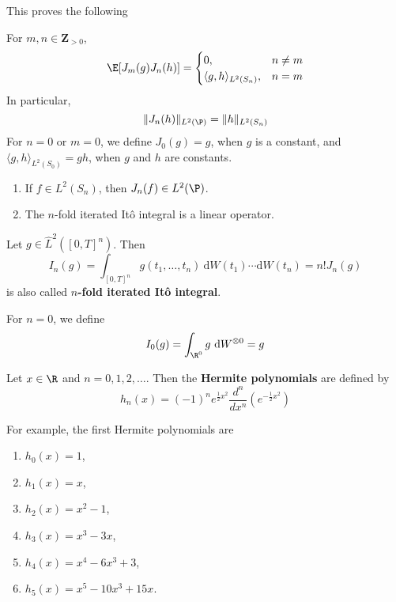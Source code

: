 This proves the following

\begin{proposition}
    For \(m, n \in \mathbf{Z}_{>0}\), \[
    \E[J_m(g) J_n(h)] = 
    \begin{cases}
        0, & n \neq m \\
        \langle g, h \rangle_{L^2(S_n)}, & n = m
    \end{cases}
    \] In particular, \[
    \| J_n(h) \|_{L^2(\P)} = \| h \|_{L^2(S_n)}
    \] For \(n = 0\) or \(m = 0\), we define \(J_0(g) = g\), when \(g\) is a
    constant, and \(\langle g, h \rangle_{L^2(S_0)} = gh\), when \(g\) and
    \(h\) are constants.
\end{proposition}

\begin{remark}
    \begin{enumerate}
        \def\labelenumi{\arabic{enumi}.}
        \item
          If \(f \in L^2(S_n)\), then \(J_n(f) \in L^2(\P)\).
        \item
          The \(n\)-fold iterated Itô integral is a linear operator.
        \end{enumerate}
\end{remark}

\begin{definition}
    Let \(g \in \hat{L}^2([0,T]^n)\). Then \[
    I_n(g) = \int_{[0,T]^n} g(t_1, \ldots, t_n) ~\mathrm{d}W(t_1) \cdots \mathrm{d}W(t_n) = n! J_n(g)
\] is also called \textbf{\(n\)-fold iterated Itô integral}.

	For $n = 0$, we define 
	\[
	I_0(g) = \int_{\R^0} g ~\mathrm{d}W^{\otimes 0} = g
	\]
\end{definition}

Let $x \in \R$ and $n = 0, 1, 2, \ldots$. Then the \textbf{Hermite polynomials}\label{hermite-polynomials} are defined by
$$
h_n(x) = (-1)^n e^{\frac{1}{2} x^2} \frac{d^n}{dx^n} \left( e^{-\frac{1}{2} x^2} \right)
$$

For example, the first Hermite polynomials are 
\begin{enumerate}
\item $h_0(x) = 1$,
\item $h_1(x) = x$,
\item $h_2(x) = x^2 - 1$,
\item $h_3(x) = x^3 - 3x$, 
\item $h_4(x) = x^4 - 6x^3 + 3$,
\item $h_5(x) = x^5 - 10x^3 + 15x$.
\end{enumerate}

